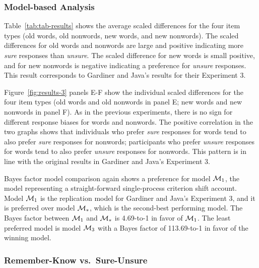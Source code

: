 \documentclass[english,,man]{apa6}
\begin{document}
\hypertarget{model-based-analysis-2}{%
\subsubsection{Model-based Analysis}\label{model-based-analysis-2}}

Table~\ref{tab:tab-results} shows the average scaled differences for the four item types (old words, old nonwords, new words, and new nonwords). The scaled differences for old words and nonwords are large and positive indicating more \emph{sure} responses than \emph{unsure}. The scaled difference for new words is small positive, and for new nonwords is negative indicating a preference for \emph{unsure} responses. This result corresponds to Gardiner and Java's results for their Experiment 3.

Figure~\ref{fig:results-3} panels E-F show the individual scaled differences for the four item types (old words and old nonwords in panel E; new words and new nonwords in panel F). As in the previous experiments, there is no sign for different response biases for words and nonwords. The positive correlation in the two graphs shows that individuals who prefer \emph{sure} responses for words tend to also prefer \emph{sure} responses for nonwords; participants who prefer \emph{unsure} responses for words tend to also prefer \emph{unsure} responses for nonwords. This pattern is in line with the original results in Gardiner and Java's Experiment 3.

Bayes factor model comparison again shows a preference for model \({\cal M}_{1}\), the model representing a straight-forward single-process criterion shift account. Model \({\cal M}_{1}\) is the replication model for Gardiner and Java's Experiment 3, and it is preferred over model \({\cal M}_{*}\), which is the second-best performing model. The Bayes factor between \({\cal M}_{1}\) and \({\cal M}_{*}\) is 4.69-to-1 in favor of \({\cal M}_{1}\). The least preferred model is model \({\cal M}_3\) with a Bayes factor of 113.69-to-1 in favor of the winning model.

\hypertarget{remember-know-vs.sure-unsure}{%
\subsubsection{Remember-Know vs.~Sure-Unsure}\label{remember-know-vs.sure-unsure}}
\end{document}

